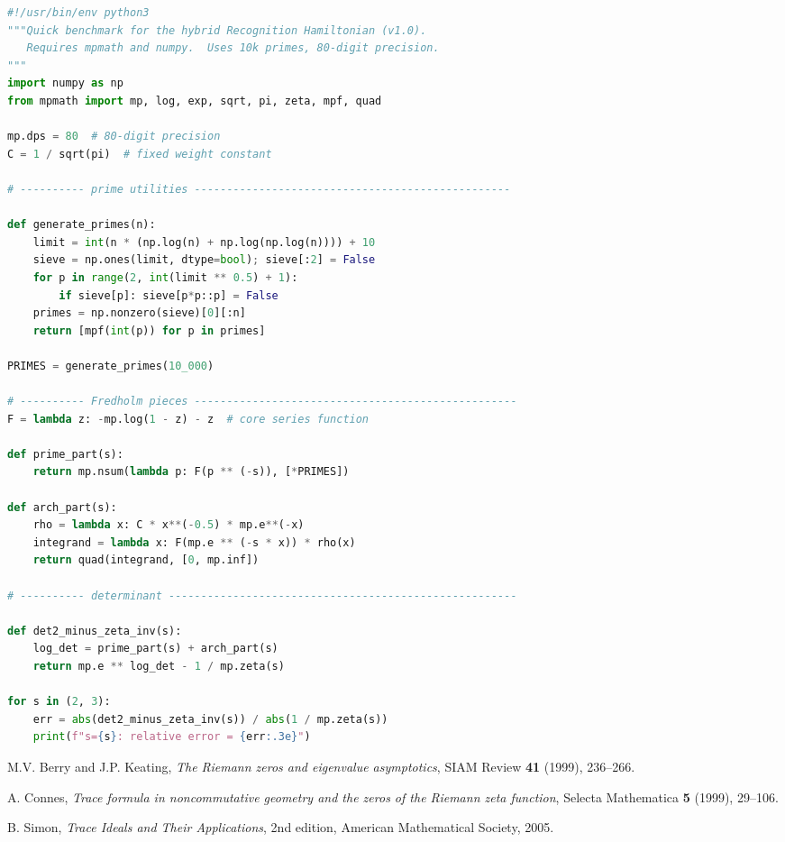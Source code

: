 \documentclass[11pt,a4paper]{article}
\theoremstyle{definition}
\theoremstyle{remark}
\begin{document}
\begin{lstlisting}[language=Python]
#!/usr/bin/env python3
"""Quick benchmark for the hybrid Recognition Hamiltonian (v1.0).
   Requires mpmath and numpy.  Uses 10k primes, 80-digit precision.
"""
import numpy as np
from mpmath import mp, log, exp, sqrt, pi, zeta, mpf, quad

mp.dps = 80  # 80-digit precision
C = 1 / sqrt(pi)  # fixed weight constant

# ---------- prime utilities -------------------------------------------------

def generate_primes(n):
    limit = int(n * (np.log(n) + np.log(np.log(n)))) + 10
    sieve = np.ones(limit, dtype=bool); sieve[:2] = False
    for p in range(2, int(limit ** 0.5) + 1):
        if sieve[p]: sieve[p*p::p] = False
    primes = np.nonzero(sieve)[0][:n]
    return [mpf(int(p)) for p in primes]

PRIMES = generate_primes(10_000)

# ---------- Fredholm pieces --------------------------------------------------
F = lambda z: -mp.log(1 - z) - z  # core series function

def prime_part(s):
    return mp.nsum(lambda p: F(p ** (-s)), [*PRIMES])

def arch_part(s):
    rho = lambda x: C * x**(-0.5) * mp.e**(-x)
    integrand = lambda x: F(mp.e ** (-s * x)) * rho(x)
    return quad(integrand, [0, mp.inf])

# ---------- determinant ------------------------------------------------------

def det2_minus_zeta_inv(s):
    log_det = prime_part(s) + arch_part(s)
    return mp.e ** log_det - 1 / mp.zeta(s)

for s in (2, 3):
    err = abs(det2_minus_zeta_inv(s)) / abs(1 / mp.zeta(s))
    print(f"s={s}: relative error = {err:.3e}")
\end{lstlisting}

\begin{thebibliography}{99}

M.V. Berry and J.P. Keating,
\emph{The Riemann zeros and eigenvalue asymptotics},
SIAM Review \textbf{41} (1999), 236--266.

A. Connes,
\emph{Trace formula in noncommutative geometry and the zeros of the Riemann zeta function},
Selecta Mathematica \textbf{5} (1999), 29--106.

B. Simon,
\emph{Trace Ideals and Their Applications}, 2nd edition,
American Mathematical Society, 2005.

\end{thebibliography}
\end{document}
